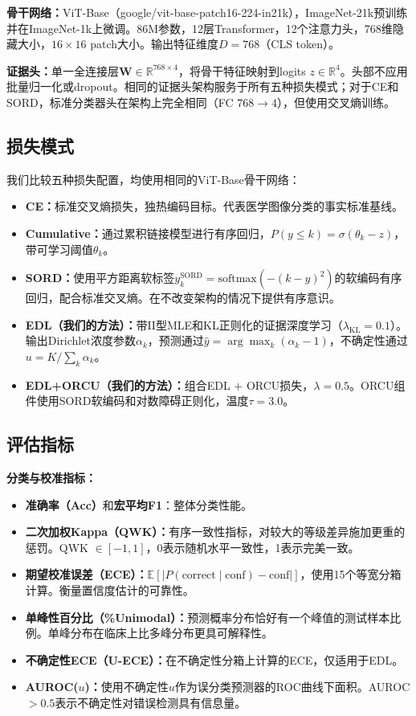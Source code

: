 \documentclass[12pt,a4paper]{ctexart}
\begin{document}
\textbf{骨干网络：}ViT-Base（google/vit-base-patch16-224-in21k），ImageNet-21k预训练并在ImageNet-1k上微调。86M参数，12层Transformer，12个注意力头，768维隐藏大小，$16 \times 16$ patch大小。输出特征维度$D = 768$（CLS token）。

\textbf{证据头：}单一全连接层$\mathbf{W} \in \mathbb{R}^{768 \times 4}$，将骨干特征映射到logits $z \in \mathbb{R}^4$。头部不应用批量归一化或dropout。相同的证据头架构服务于所有五种损失模式；对于CE和SORD，标准分类器头在架构上完全相同（FC $768 \to 4$），但使用交叉熵训练。

\subsection{损失模式}

我们比较五种损失配置，均使用相同的ViT-Base骨干网络：

\begin{itemize}
    \item \textbf{CE：}标准交叉熵损失，独热编码目标。代表医学图像分类的事实标准基线。
    \item \textbf{Cumulative：}通过累积链接模型进行有序回归，$P(y \leq k) = \sigma(\theta_k - z)$，带可学习阈值$\theta_k$。
    \item \textbf{SORD：}使用平方距离软标签$y_k^{\mathrm{SORD}} = \mathrm{softmax}(-(k - y)^2)$的软编码有序回归，配合标准交叉熵。在不改变架构的情况下提供有序意识。
    \item \textbf{EDL（我们的方法）：}带II型MLE和KL正则化的证据深度学习（$\lambda_{\mathrm{KL}} = 0.1$）。输出Dirichlet浓度参数$\alpha_k$，预测通过$\hat{y} = \arg\max_k(\alpha_k - 1)$，不确定性通过$u = K / \sum_k \alpha_k$。
    \item \textbf{EDL+ORCU（我们的方法）：}组合EDL $+$ ORCU损失，$\lambda = 0.5$。ORCU组件使用SORD软编码和对数障碍正则化，温度$\tau = 3.0$。
\end{itemize}

\subsection{评估指标}

\textbf{分类与校准指标：}
\begin{itemize}
    \item \textbf{准确率（Acc）}和\textbf{宏平均F1}：整体分类性能。
    \item \textbf{二次加权Kappa（QWK）：}有序一致性指标，对较大的等级差异施加更重的惩罚。QWK $\in [-1, 1]$，0表示随机水平一致性，1表示完美一致。
    \item \textbf{期望校准误差（ECE）：}$\mathbb{E}[|P(\text{correct} \mid \text{conf}) - \text{conf}|]$，使用15个等宽分箱计算。衡量置信度估计的可靠性。
    \item \textbf{单峰性百分比（\%Unimodal）：}预测概率分布恰好有一个峰值的测试样本比例。单峰分布在临床上比多峰分布更具可解释性。
    \item \textbf{不确定性ECE（U-ECE）：}在不确定性分箱上计算的ECE，仅适用于EDL。
    \item \textbf{AUROC($u$)：}使用不确定性$u$作为误分类预测器的ROC曲线下面积。AUROC $>0.5$表示不确定性对错误检测具有信息量。
\end{itemize}
\end{document}
